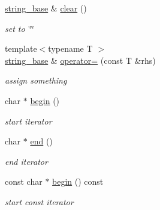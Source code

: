 \begin{DoxyCompactItemize}
\hyperlink{classhwlib_1_1string__base}{string\+\_\+base} \& \hyperlink{classhwlib_1_1string__base_aeca01859d90cd3b39d9320d404ad893d}{clear} ()
\begin{DoxyCompactList}\small\item\em set to \char`\"{}\char`\"{} \end{DoxyCompactList}\item 
\mbox{\label{classhwlib_1_1string__base_a3b6486db9213c7b0a4b16eaca77f5ea9}} 
{\footnotesize template$<$typename T $>$ }\\\hyperlink{classhwlib_1_1string__base}{string\+\_\+base} \& \hyperlink{classhwlib_1_1string__base_a3b6486db9213c7b0a4b16eaca77f5ea9}{operator=} (const T \&rhs)
\begin{DoxyCompactList}\small\item\em assign something \end{DoxyCompactList}\item 
\mbox{\label{classhwlib_1_1string__base_a5c4a926e11bba47de618f570ee5f3bae}} 
char $\ast$ \hyperlink{classhwlib_1_1string__base_a5c4a926e11bba47de618f570ee5f3bae}{begin} ()
\begin{DoxyCompactList}\small\item\em start iterator \end{DoxyCompactList}\item 
\mbox{\label{classhwlib_1_1string__base_a6b9064e8e05b29fdf7bea1cc5548b3af}} 
char $\ast$ \hyperlink{classhwlib_1_1string__base_a6b9064e8e05b29fdf7bea1cc5548b3af}{end} ()
\begin{DoxyCompactList}\small\item\em end iterator \end{DoxyCompactList}\item 
\mbox{\label{classhwlib_1_1string__base_ac45d75a05d26d0c91aa3ad4ce9ce4bd2}} 
const char $\ast$ \hyperlink{classhwlib_1_1string__base_ac45d75a05d26d0c91aa3ad4ce9ce4bd2}{begin} () const
\begin{DoxyCompactList}\small\item\em start const iterator \end{DoxyCompactList}\item 
\mbox{\label{classhwlib_1_1string__base_acc447dff343555d3cae9a9c6251aaa21}} 

\end{DoxyCompactItemize}
